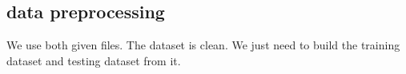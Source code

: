 \subsection{data preprocessing}
We use both given files. The dataset is clean. We just need to build the training dataset and testing dataset from it. \\